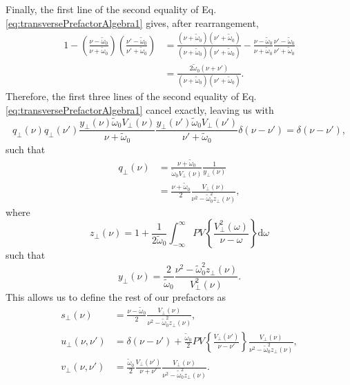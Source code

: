 \documentclass{article}
\begin{document}
Finally, the first line of the second equality of Eq. \eqref{eq:transversePrefactorAlgebra1} gives, after rearrangement,
\begin{equation}
\begin{split}
1 - \left(\frac{\nu - \tilde{\omega}_0}{\nu + \tilde{\omega}_0}\right)\left(\frac{\nu' - \tilde{\omega}_0}{\nu' + \tilde{\omega}_0}\right) &= \frac{(\nu + \tilde{\omega}_0)(\nu' + \tilde{\omega}_0)}{(\nu + \tilde{\omega}_0)(\nu' + \tilde{\omega}_0)} - \frac{\nu - \tilde{\omega}_0}{\nu + \tilde{\omega}_0}\frac{\nu' - \tilde{\omega}_0}{\nu' + \tilde{\omega}_0}\\
&= \frac{2\tilde{\omega}_0(\nu + \nu')}{(\nu + \tilde{\omega}_0)(\nu' + \tilde{\omega}_0)}.
\end{split}
\end{equation}
Therefore, the first three lines of the second equality of Eq. \eqref{eq:transversePrefactorAlgebra1} cancel exactly, leaving us with
\begin{equation}
q_\perp(\nu)q_\perp(\nu')\frac{y_\perp(\nu)\tilde{\omega}_0V_\perp(\nu)}{\nu + \tilde{\omega}_0}\frac{y_\perp(\nu')\tilde{\omega}_0V_\perp(\nu')}{\nu' + \tilde{\omega}_0}\delta(\nu - \nu') = \delta(\nu - \nu'),
\end{equation}
such that
\begin{equation}
\begin{split}
q_\perp(\nu) &= \frac{\nu + \tilde{\omega}_0}{\tilde{\omega}_0V_\perp(\nu)}\frac{1}{y_\perp(\nu)}\\
&= \frac{\nu + \tilde{\omega}_0}{2}\frac{V_\perp(\nu)}{\nu^2 - \tilde{\omega}_0^2z_\perp(\nu)},
\end{split}
\end{equation}
where
\begin{equation}
z_\perp(\nu) = 1 + \frac{1}{2\tilde{\omega}_0}\int_{-\infty}^\infty PV\left\{\frac{V_\perp^2(\omega)}{\nu - \omega}\right\}\mathrm{d}\omega
\end{equation}
such that
\begin{equation}
y_\perp(\nu) = \frac{2}{\tilde{\omega}_0}\frac{\nu^2 - \tilde{\omega}_0^2z_\perp(\nu)}{V_\perp^2(\nu)}.
\end{equation}
This allows us to define the rest of our prefactors as
\begin{equation}
\begin{split}
s_\perp(\nu) &= \frac{\nu - \tilde{\omega}_0}{2}\frac{V_\perp(\nu)}{\nu^2 - \tilde{\omega}_0^2z_\perp(\nu)},\\
u_\perp(\nu,\nu') &= \delta(\nu - \nu') + \frac{\tilde{\omega}_0}{2}PV\left\{\frac{V_\perp(\nu')}{\nu - \nu'}\right\}\frac{V_\perp(\nu)}{\nu^2 - \tilde{\omega}_0^2z_\perp(\nu)},\\
v_\perp(\nu,\nu') &= \frac{\tilde{\omega}_0}{2}\frac{V_\perp(\nu')}{\nu + \nu'}\frac{V_\perp(\nu)}{\nu^2 - \tilde{\omega}_0^2z_\perp(\nu)}.
\end{split}
\end{equation}
\end{document}
